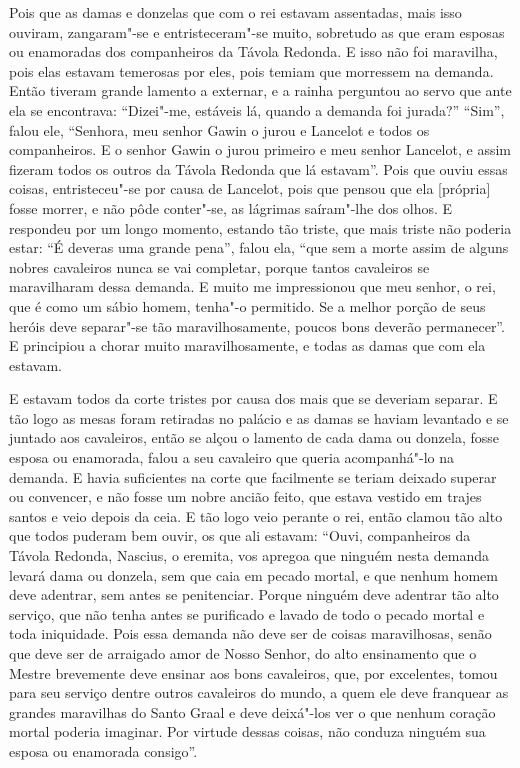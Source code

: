 Pois que as damas e donzelas que com o rei estavam assentadas, mais isso
ouviram, zangaram"-se e entristeceram"-se muito, sobretudo as que eram esposas ou
enamoradas dos companheiros da Távola Redonda. E isso não foi maravilha, pois
elas estavam temerosas por eles, pois temiam que morressem na demanda. Então
tiveram grande lamento a externar, e a rainha perguntou ao servo que ante ela
se encontrava: “Dizei"-me, estáveis lá, quando a demanda foi jurada?” “Sim”,
falou ele, “Senhora, meu senhor Gawin o jurou e Lancelot e todos os
companheiros. E o senhor Gawin o jurou primeiro e meu senhor Lancelot, e assim
fizeram todos os outros da Távola Redonda que lá estavam”. Pois que ouviu essas
coisas, entristeceu"-se por causa de Lancelot, pois que pensou que ela [própria] fosse
morrer, e não pôde conter"-se, as lágrimas saíram"-lhe dos olhos. E respondeu por um
longo momento, estando tão triste, que mais triste não poderia estar: “É
deveras uma grande pena”, falou ela, “que sem a morte assim de alguns nobres
cavaleiros nunca se vai completar, porque tantos cavaleiros se maravilharam
dessa demanda. E muito me impressionou que meu senhor, o rei, que é como um
sábio homem, tenha"-o permitido. Se a melhor porção de seus heróis deve
separar"-se tão maravilhosamente, poucos bons deverão permanecer”. E principiou
a chorar muito maravilhosamente, e todas as damas que com ela estavam. 

E estavam todos da corte tristes por causa dos mais que se deveriam separar. E
tão logo as mesas foram retiradas no palácio e as damas se haviam levantado e
se juntado aos cavaleiros, então se alçou o lamento de cada dama ou donzela,
fosse esposa ou enamorada, falou a seu cavaleiro que queria acompanhá"-lo na
demanda. E havia suficientes na corte que facilmente se teriam deixado superar
ou convencer, e não fosse um nobre ancião feito, que estava vestido em trajes
santos e veio depois da ceia. E tão logo veio perante o rei, então clamou tão
alto que todos puderam bem ouvir, os que ali estavam: “Ouvi, companheiros da
Távola Redonda, Nascius, o eremita, vos apregoa que ninguém nesta demanda
levará dama ou donzela, sem que caia em pecado mortal, e que nenhum homem deve
adentrar, sem antes se penitenciar. Porque ninguém deve adentrar tão alto
serviço, que não tenha antes se purificado e lavado de todo o pecado mortal e
toda iniquidade. Pois essa demanda não deve ser de coisas maravilhosas, senão
que deve ser de arraigado amor de Nosso Senhor, do alto ensinamento que o
Mestre brevemente deve ensinar aos bons cavaleiros, que, por excelentes, tomou
para seu serviço dentre outros cavaleiros do mundo, a quem ele deve franquear
as grandes maravilhas do Santo Graal e deve deixá"-los ver o que nenhum coração
mortal poderia imaginar. Por virtude dessas coisas, não conduza ninguém sua
esposa ou enamorada consigo”. 

